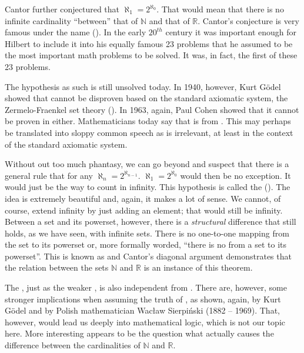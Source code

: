 \documentclass[tikz]{scrreprt}
\begin{document}
Cantor further conjectured that
$\aleph_1 = 2^{\aleph_0}$.
That would mean that there is no infinite cardinality
``between'' that of $\mathbb{N}$ and that of $\mathbb{R}$.
Cantor's conjecture is very famous under the name
 ().
In the early $20^{th}$ century it was important enough
for Hilbert to include it into his equally famous 23 problems
that he assumed to be the most important math problems
to be solved. It was, in fact, the first of these 23 problems.

The hypothesis as such is still unsolved today.
In 1940, however, Kurt Gödel showed
that  cannot be disproven based on the standard
axiomatic system, the Zermelo-Fraenkel set theory ().
In 1963, again, Paul Cohen showed
that it cannot be proven in  either.
Mathematicians today say that  
is  from .
This may perhaps be translated into sloppy common speech as
 is irrelevant, at least in the context
of the standard axiomatic system.

Without out too much phantasy, 
we can go beyond  and suspect 
that there is a general rule that
for any $\aleph_n=2^{\aleph_{n-1}}$.
$\aleph_1=2^{\aleph_0}$ would then be no exception.
It would just be the way to count in infinity.
This hypothesis is called the
 ().
The idea is extremely beautiful and, again,
it makes a lot of sense.
We cannot, of course, extend infinity
by just adding an element; that would still be infinity.
Between a set and its powerset, however, there is
a \emph{structural} difference that still holds,
as we have seen, with infinite sets.
There is no one-to-one mapping 
from the set to its powerset or, more formally worded,
``there is
no  from a set to its powerset''.
This is known as  and
Cantor's diagonal argument demonstrates that 
the relation between the sets
$\mathbb{N}$ and $\mathbb{R}$
is an instance of this theorem.

The , just as the weaker ,
is also independent from .
There are, however, some stronger implications
when assuming the truth of , as shown, again,
by Kurt Gödel and by Polish mathematician
Wac\l{}aw Sierpiński (1882 -- 1969).
That, however, would lead us deeply 
into mathematical logic, which is not our topic here.
More interesting appears to be the question
what actually causes the difference between
the cardinalities of $\mathbb{N}$ and $\mathbb{R}$.
\end{document}
